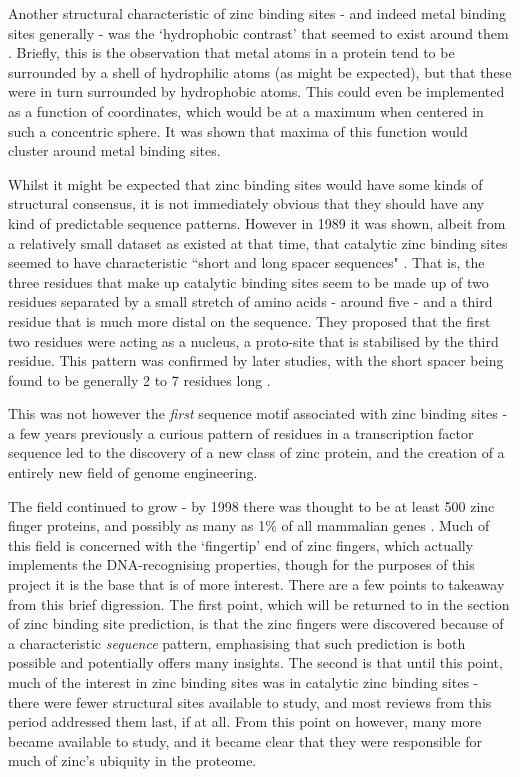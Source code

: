 Another structural characteristic of zinc binding sites - and indeed metal binding sites generally - was the `hydrophobic contrast' that seemed to exist around them \cite{yamashita1990metal,gregory1993prediction}. Briefly, this is the observation that metal atoms in a protein tend to be surrounded by a shell of hydrophilic atoms (as might be expected), but that these were in turn surrounded by hydrophobic atoms. This could even be implemented as a function of coordinates, which would be at a maximum when centered in such a concentric sphere. It was shown that maxima of this function would cluster around metal binding sites.

Whilst it might be expected that zinc binding sites would have some kinds of structural consensus, it is not immediately obvious that they should have any kind of predictable sequence patterns. However in 1989 it was shown, albeit from a relatively small dataset as existed at that time, that catalytic zinc binding sites seemed to have characteristic ``short and long spacer sequences" \cite{vallee1989short}. That is, the three residues that make up catalytic binding sites seem to be made up of two residues separated by a small stretch of amino acids - around five - and a third residue that is much more distal on the sequence. They proposed that the first two residues were acting as a nucleus, a proto-site that is stabilised by the third residue. This pattern was confirmed by later studies, with the short spacer being found to be generally 2 to 7 residues long \cite{patel2007analysis}.

This was not however the \textit{first} sequence motif associated with zinc binding sites - a few years previously a curious pattern of residues in a transcription factor sequence led to the discovery of a new class of zinc protein, and the creation of a entirely new field of genome engineering.


The field continued to grow - by 1998 there was thought to be at least 500 zinc finger proteins, and possibly as many as 1\% of all mammalian genes \cite{mackay1998zinc}. Much of this field is concerned with the `fingertip' end of zinc fingers, which actually implements the DNA-recognising properties, though for the purposes of this project it is the base that is of more interest. There are a few points to takeaway from this brief digression. The first point, which will be returned to in the section of zinc binding site prediction, is that the zinc fingers were discovered because of a characteristic \textit{sequence} pattern, emphasising that such prediction is both possible and potentially offers many insights. The second is that until this point, much of the interest in zinc binding sites was in catalytic zinc binding sites - there were fewer structural sites available to study, and most reviews from this period addressed them last, if at all. From this point on however, many more became available to study, and it became clear that they were responsible for much of zinc's ubiquity in the proteome.

